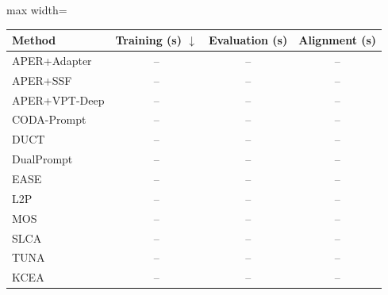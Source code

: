 \renewcommand{\arraystretch}{0.95}
\begin{adjustbox}{max width=\textwidth}
\footnotesize
\begin{tabular}{l c c c}
\toprule
Method & \textbf{Training (s)} $\downarrow$ & \textbf{Evaluation (s)} & \textbf{Alignment (s)} \\
\midrule
APER+Adapter & -- & -- & -- \\
APER+SSF & -- & -- & -- \\
APER+VPT-Deep & -- & -- & -- \\
CODA-Prompt & -- & -- & -- \\
DUCT & -- & -- & -- \\
DualPrompt & -- & -- & -- \\
EASE & -- & -- & -- \\
L2P & -- & -- & -- \\
MOS & -- & -- & -- \\
SLCA & -- & -- & -- \\
TUNA & -- & -- & -- \\
\midrule
KCEA & -- & -- & -- \\
\bottomrule
\end{tabular}
\end{adjustbox}